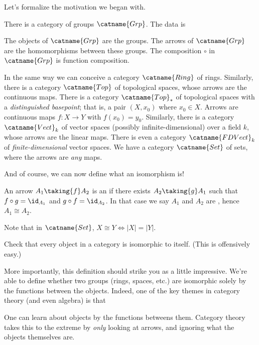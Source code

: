 Let's formalize the motivation we began with.
\begin{example}
	\listhack
	\label{example:basic_categories}
	\begin{enumerate}[(a)]
		\ii There is a category of groups $\catname{Grp}$. The data is
		\begin{itemize}
			\ii The objects of $\catname{Grp}$ are the groups.
			\ii The arrows of $\catname{Grp}$ are the homomorphisms between these groups.
			\ii The composition $\circ$ in $\catname{Grp}$ is function composition.
		\end{itemize}
		\ii In the same way we can conceive a category $\catname{Ring}$ of rings.
		\ii Similarly, there is a category $\catname{Top}$ of topological spaces,
		whose arrows are the continuous maps.
		\ii There is a category $\catname{Top}_\ast$ of topological spaces with a \emph{distinguished basepoint};
		that is, a pair $(X, x_0)$ where $x_0 \in X$.
		Arrows are continuous maps $f : X \to Y$ with $f(x_0) = y_0$.
		\ii Similarly, there is a category $\catname{Vect}_k$ of
		vector spaces (possibly infinite-dimensional) over a field $k$,
		whose arrows are the linear maps.
		There is even a category $\catname{FDVect}_k$ of
		\emph{finite-dimensional} vector spaces.
		\ii We have a category $\catname{Set}$ of sets,
		where the arrows are \emph{any} maps.
	\end{enumerate}
\end{example}
And of course, we can now define what an isomorphism is!
\begin{definition}
	An arrow $A_1 \taking{f} A_2$ is an 
	if there exists $A_2 \taking{g} A_1$ such that $f \circ g = \id_{A_1}$
	and $g \circ f = \id_{A_2}$.
	In that case we say $A_1$ and $A_2$ are , hence $A_1 \cong A_2$.
\end{definition}
\begin{remark}
	Note that in $\catname{Set}$, $X \cong Y
	\iff \left\lvert X \right\rvert = \left\lvert Y \right\rvert$.
\end{remark}
\begin{ques}
	Check that every object in a category is isomorphic to itself.
	(This is offensively easy.)
\end{ques}
More importantly, this definition should strike you as a little impressive.
We're able to define whether two groups (rings, spaces, etc.) are isomorphic
solely by the functions between the objects.
Indeed, one of the key themes in category theory (and even algebra) is that
\begin{moral}
	One can learn about objects by the functions betweens them.
	Category theory takes this to the extreme by \emph{only} looking at arrows,
	and ignoring what the objects themselves are.
\end{moral}

